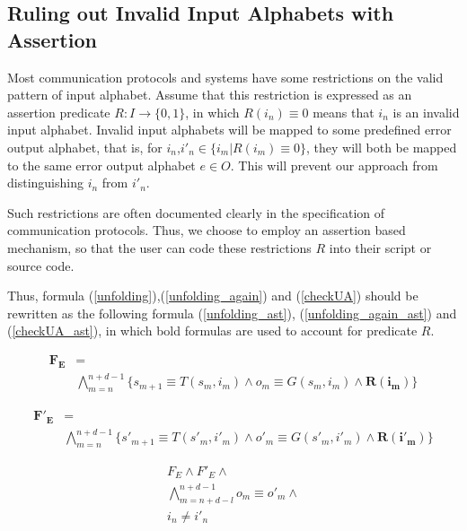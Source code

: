 \documentclass[journal]{IEEEtran}
\begin{document}
\subsection{Ruling out Invalid Input Alphabets with Assertion}\label{subsec_AST}

Most communication protocols and systems have some restrictions on the valid pattern of input alphabet.
Assume that this restriction is expressed as an assertion predicate $R: I\to \{0,1\}$,
in which $R(i_{n})\equiv 0$ means that $i_n$ is an invalid input alphabet.
Invalid input alphabets will be mapped to some predefined error output alphabet,
that is,
for $i_n$,$i'_n\in \{i_m|R(i_m)\equiv 0\}$,
they will both be mapped to the same error output alphabet $e\in O$.
This will prevent our approach from distinguishing $i_n$ from $i'_n$.

Such restrictions are often documented clearly in the specification of communication protocols.
Thus,
we choose to employ an assertion based mechanism,
so that the user can code these restrictions $R$ into their script or source code.

Thus, formula (\ref{unfolding}),(\ref{unfolding_again}) and (\ref{checkUA}) should be rewritten as the following formula (\ref{unfolding_ast}), (\ref{unfolding_again_ast}) and (\ref{checkUA_ast}),
in which bold formulas are used to account for predicate $R$.

\begin{equation}\label{unfolding_ast}
\begin{split}
\boldsymbol{F_E} &= \\
&
\bigwedge_{m=n}^{n+d-1}
\Big\{
s_{m+1}\equiv T(s_m,i_m) \wedge
o_m\equiv G(s_m,i_m) \wedge
\boldsymbol{R (i_m)}
\Big\}
\end{split}
\end{equation}

\begin{equation}\label{unfolding_again_ast}
\begin{split}
\boldsymbol{F'_E} &= \\
&
\bigwedge_{m=n}^{n+d-1}
\Big\{
s'_{m+1}\equiv T(s'_m,i'_m) \wedge
o'_m\equiv G(s'_m,i'_m) \wedge
\boldsymbol{R (i'_m)}
\Big\}
\end{split}
\end{equation}

\begin{equation}\label{checkUA_ast}
\begin{array}{c}
F_E\wedge F'_E \wedge \\
\bigwedge_{m=n+d-l}^{n+d-1}o_m\equiv o'_m\wedge \\
i_n\ne i'_n
\end{array}
\end{equation}
\end{document}
